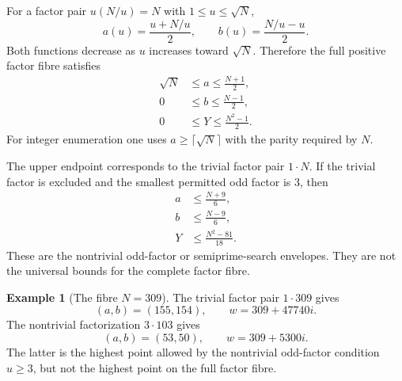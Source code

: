\documentclass[11pt]{article}
\theoremstyle{definition}
\newtheorem{example}[theorem]{Example}
\theoremstyle{remark}
\newcommand{\1}{\mathbf{1}}
\begin{document}
For a factor pair $u(N/u)=N$ with $1\le u\le\sqrt N$,
\begin{equation}
 a(u)=\frac{u+N/u}{2},
 \qquad
 b(u)=\frac{N/u-u}{2}.
 \label{eq:ab-u}
\end{equation}
Both functions decrease as $u$ increases toward $\sqrt N$.  Therefore the full positive factor fibre satisfies
\begin{align}
 \sqrt N&\le a\le\frac{N+1}{2},
 \label{eq:a-full-range}\\
 0&\le b\le\frac{N-1}{2},
 \label{eq:b-full-range}\\
 0&\le Y\le\frac{N^2-1}{2}.
 \label{eq:Y-full-range}
\end{align}
For integer enumeration one uses $a\ge\lceil\sqrt N\rceil$ with the parity required by $N$.

The upper endpoint corresponds to the trivial factor pair $1\cdot N$.  If the trivial factor is excluded and the smallest permitted odd factor is $3$, then
\begin{align}
 a&\le\frac{N+9}{6},
 \label{eq:a-three}\\
 b&\le\frac{N-9}{6},
 \label{eq:b-three}\\
 Y&\le\frac{N^2-81}{18}.
 \label{eq:Y-three}
\end{align}
These are the nontrivial odd-factor or semiprime-search envelopes.  They are not the universal bounds for the complete factor fibre.

\begin{example}[The fibre $N=309$]
The trivial factor pair $1\cdot309$ gives
\[
 (a,b)=(155,154),
 \qquad
 w=309+47740i.
\]
The nontrivial factorization $3\cdot103$ gives
\[
 (a,b)=(53,50),
 \qquad
 w=309+5300i.
\]
The latter is the highest point allowed by the nontrivial odd-factor condition $u\ge3$, but not the highest point on the full factor fibre.
\end{example}
\end{document}
